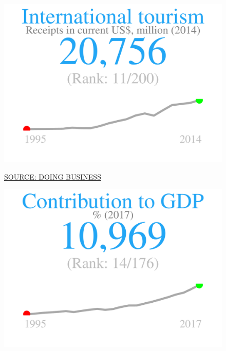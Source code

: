 \documentclass{article}\usepackage[]{graphicx}\usepackage[]{color}
\makeatletter
\def\maxwidth{ %
  \ifdim\Gin@nat@width>\linewidth
    \linewidth
  \else
    \Gin@nat@width
  \fi
}
\makeatother
\begin{document}
\begin{figure}
\begin{minipage}[t]{0.99\textwidth}
\begin{minipage}[t]{0.56\textwidth}
\begin{minipage}[c]{0.30\textwidth}
{\centering \includegraphics[width=\maxwidth]{figure/figure_sparkline2-1} 

}



    \vspace{-2ex}
    \hspace{2ex}\tiny{\href{http://data.worldbank.org/}{\textcolor[HTML]{22A6F5}{SOURCE: DOING BUSINESS}}}
    \vspace{3ex}
    \end{minipage}
    \begin{minipage}[c]{0.30\textwidth}


{\centering \includegraphics[width=\maxwidth]{figure/figure_sparkline3-1} 

}




\end{minipage}
\end{minipage}
\end{minipage}
\end{figure}
\end{document}
